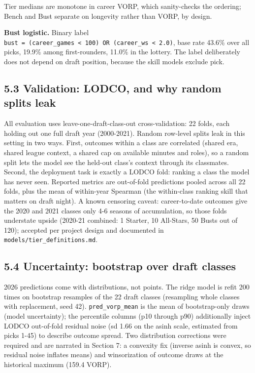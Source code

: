 \documentclass[
  10pt,
]{article}
\begin{document}
Tier medians are monotone in career VORP, which sanity-checks the ordering;
Bench and Bust separate on longevity rather than VORP, by design.

\textbf{Bust logistic.} Binary label
\texttt{bust\ =\ (career\_games\ \textless{}\ 100)\ OR\ (career\_ws\ \textless{}\ 2.0)},
base rate 43.6\% over all picks, 19.9\% among first-rounders, 11.0\% in the
lottery. The label deliberately does not depend on draft position, because the
skill models exclude pick.

\subsection{5.3 Validation: LODCO, and why random splits
leak}\label{validation-lodco-and-why-random-splits-leak}

All evaluation uses leave-one-draft-class-out cross-validation: 22 folds, each
holding out one full draft year (2000-2021). Random row-level splits leak in
this setting in two ways. First, outcomes within a class are correlated (shared
era, shared league context, a shared cap on available minutes and roles), so a
random split lets the model see the held-out class's context through its
classmates. Second, the deployment task is exactly a LODCO fold: ranking a class
the model has never seen. Reported metrics are out-of-fold predictions pooled
across all 22 folds, plus the mean of within-year Spearman (the within-class
ranking skill that matters on draft night). A known censoring caveat:
career-to-date outcomes give the 2020 and 2021 classes only 4-6 seasons of
accumulation, so those folds understate upside (2020-21 combined: 1 Starter, 10
All-Stars, 50 Busts out of 120); accepted per project design and documented in
\texttt{models/tier\_definitions.md}.

\subsection{5.4 Uncertainty: bootstrap over draft
classes}\label{uncertainty-bootstrap-over-draft-classes}

2026 predictions come with distributions, not points. The ridge model is refit
200 times on bootstrap resamples of the 22 draft classes (resampling whole
classes with replacement, seed 42). \texttt{pred\_vorp\_mean} is the mean of
bootstrap-only draws (model uncertainty); the percentile columns (p10 through
p90) additionally inject LODCO out-of-fold residual noise (sd 1.66 on the asinh
scale, estimated from picks 1-45) to describe outcome spread. Two distribution
corrections were required and are narrated in Section 7: a convexity fix
(inverse asinh is convex, so residual noise inflates means) and winsorization of
outcome draws at the historical maximum (159.4 VORP).
\end{document}
